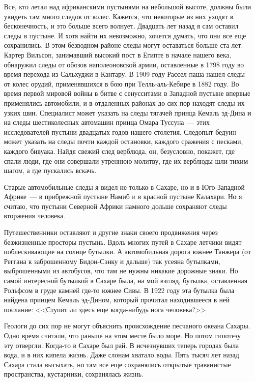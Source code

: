\documentclass[12pt,a4paper,twoside,openany,svgnames]{memoir}
\begin{document}
Все, кто летал над африканскими пустынями на небольшой высоте, должны были увидеть там много следов от колес. Кажется, что некоторые из них уходят в бесконечность, и это больше всего волнует. Двадцать лет назад я сам оставил следы в пустыне. И хотя найти их невозможно, хочется думать, что они все еще сохранились. В этом безводном районе следы могут оставаться больше ста лет. Картер Вильсон, занимавший высокий пост в Египте в начале нашего века, обнаружил следы от обозов наполеоновской армии, оставленные в 1798 году во время перехода из Сальхуджи в Кантару. В 1909 году Рассел-паша нашел следы от колес орудий, применявшихся в бою при Телль-аль-Кебире в 1882 году. Во время первой мировой войны в битве с сенусситами в Западной пустыне впервые применялись автомобили, и в отдаленных районах до сих пор находят следы их узких шин. Специалист может указать на следы тягачей принца Кемаль эд-Дина и на следы шестиколесных автомашин принца Омара Туссуна~--- этих исследователей пустыни двадцатых годов нашего столетия. Следопыт-бедуин может указать на следы почти каждой остановки, каждого сражения с песками, каждого бивуака. Найдя свежий след верблюда, он, безусловно, покажет, где спали люди, где они совершали утреннюю молитву, где их верблюды шли тихим шагом, а где пускались вскачь.

Старые автомобильные следы я видел не только в Сахаре, но и в Юго-Западной Африке~--- в прибрежной пустыне Намиб и в красной пустыне Калахари. Но я считаю, что пустыни Северной Африки намного дольше сохраняют следы вторжения человека.

Путешественники оставляют и другие знаки своего продвижения через безжизненные просторы пустынь. Вдоль многих путей в Сахаре летчики видят поблескивающие на солнце бутылки. А автомобильная дорога южнее Танжера (от Реггана к заброшенному Бидон-Сэнку и дальше) так усеяна бутылками, выброшенными из автобусов, что там не нужны никакие дорожные знаки. Но самой интересной бутылкой в Сахаре была, на мой взгляд, бутылка, оставленная Рольфсом в груде камней где-то южнее Сивы. В 1922 году эта бутылка была найдена принцем Кемаль эд-Дином, который прочитал находившееся в ней послание: <<Ступит ли здесь еще когда-нибудь нога человека?>>

Геологи до сих пор не могут объяснить происхождение песчаного океана Сахары. Одно время считали, что раньше на этом месте было море. Но потом гипотезу эту отвергли. Когда-то в Сахаре был рай. В исчезнувших теперь городах была вода, и в них кипела жизнь. Даже слонам хватало воды. Пять тысяч лет назад Сахара стала высыхать, но там все еще сохранялись открытые травянистые пространства, кустарники, сохранялась жизнь.
\end{document}
